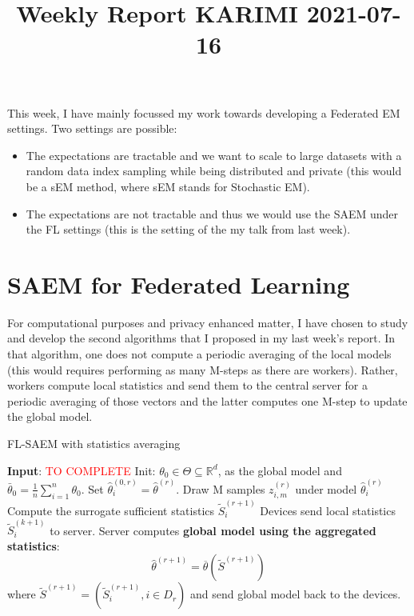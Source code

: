 \documentclass{article}
\begin{document}
\title{Weekly Report KARIMI 2021-07-16}


\date{}
\maketitle

This week, I have mainly focussed my work towards developing a Federated EM settings.
Two settings are possible: 
\begin{itemize}
\item The expectations are tractable and we want to scale to large datasets with a random data index sampling while being distributed and private (this would be a sEM method, where sEM stands for Stochastic EM).
\item The expectations are not tractable and thus we would use the SAEM under the FL settings (this is the setting of the my talk from last week).
\end{itemize}

\section{SAEM for Federated Learning}

For computational purposes and privacy enhanced matter, I have chosen to study and develop the second algorithms that I proposed in my last week's report.
In that algorithm, one does not compute a periodic averaging of the local models (this would requires performing as many M-steps as there are workers).
Rather, workers compute local statistics and send them to the central server for a periodic averaging of those vectors and the latter computes one M-step to update the global model.

\begin{algorithm}[H]
\caption{FL-SAEM with statistics averaging} \label{alg:flsaem2}
\begin{algorithmic}[1]
\STATE \textbf{Input}: \textcolor{red}{TO COMPLETE}
\STATE Init: $\theta_{0} \in \Theta \subseteq \mathbb R^d $, as the global model and $\bar{\theta}_0 =  \frac{1}{n} \sum_{i=1}^n \theta_0$.
\STATE Set $\hat{\theta}^{(0,r)}_i = \hat{\theta}^{(r)}$.
\STATE Draw M samples $z_{i,m}^{(r)}$ under model $\hat{\theta}^{(r)}_i$ \label{line:sampling}
\STATE Compute the surrogate sufficient statistics $\tilde{S}_{i}^{(r+1)}$ \label{line:compute}
\STATE Devices send local statistics $\tilde{S}_{i}^{(k+1)}$ to server.
\ENDFOR
\STATE Server computes \textbf{global model using the aggregated statistics}:
$$
\hat{\theta}^{(r+1)} = \overline{\theta}( \tilde{S}^{(r+1)}) 
$$
where $\tilde{S}^{(r+1)} = (\tilde{S}_i^{(r+1)}, i \in D_r)$  and send global model back to the devices. 
\ENDFOR
\end{algorithmic}
\end{algorithm}
\end{document}
